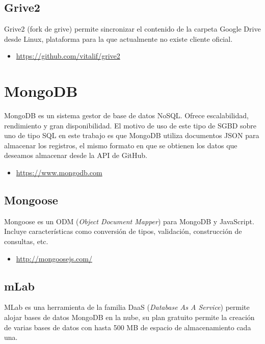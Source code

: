 \subsection{Grive2}

Grive2 (fork de grive) permite sincronizar el contenido de la carpeta Google Drive desde Linux, plataforma para la que actualmente no existe cliente oficial.

\begin{itemize}
	\item \url{https://github.com/vitalif/grive2}
\end{itemize}

\section{MongoDB}

MongoDB es un sistema gestor de base de datos NoSQL. Ofrece escalabilidad, rendimiento y gran disponibilidad. El motivo de uso de este tipo de SGBD sobre uno de tipo SQL en este trabajo es que MongoDB utiliza documentos JSON para almacenar los registros, el mismo formato en que se obtienen los datos que deseamos almacenar desde la API de GitHub.

\begin{itemize}
	\item \url{https://www.mongodb.com}
\end{itemize}

\subsection{Mongoose}

Mongoose es un ODM (\textit{Object Document Mapper}) para MongoDB y JavaScript. Incluye características como conversión de tipos, validación, construcción de consultas, etc.

\begin{itemize}
	\item \url{http://mongoosejs.com/}
\end{itemize}

\subsection{mLab}

MLab es una herramienta de la familia DaaS (\textit{Database As A Service}) permite alojar bases de datos MongoDB en la nube, su plan gratuito permite la creación de varias bases de datos con hasta 500 MB de espacio de almacenamiento cada una.

